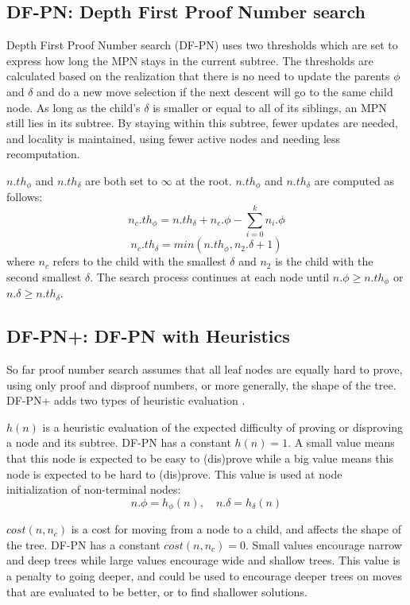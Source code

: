 \subsection{DF-PN: Depth First Proof Number search} \label{sec:DF-PN}

Depth First Proof Number search (DF-PN)\cite{nagai1999-DFPN} uses two thresholds which are set to express how long the MPN stays in the current subtree. The thresholds are calculated based on the realization that there is no need to update the parents $\phi$ and $\delta$ and do a new move selection if the next descent will go to the same child node. As long as the child's $\delta$ is smaller or equal to all of its siblings, an MPN still lies in its subtree. By staying within this subtree, fewer updates are needed, and locality is maintained, using fewer active nodes and needing less recomputation.

$n.th_\phi$ and $n.th_\delta$ are both set to $\infty$ at the root. $n.th_\phi$ and $n.th_\delta$ are computed as follows: $$n_c.th_\phi = n.th_\delta + n_c.\phi - \displaystyle\sum\limits_{i=0}^k n_i. \phi$$ $$n_c.th_\delta = min(n.th_\phi, n_2.\delta + 1)$$ where $n_c$ refers to the child with the smallest $\delta$ and $n_2$ is the child with the second smallest $\delta$. The search process continues at each node until $n.\phi \geq n.th_\phi$ or $n.\delta \geq n.th_\delta$.


\subsection{DF-PN+: DF-PN with Heuristics} \label{sec:DF-PN+}

So far proof number search assumes that all leaf nodes are equally hard to prove, using only proof and disproof numbers, or more generally, the shape of the tree. DF-PN+ adds two types of heuristic evaluation \cite{nagai-thesis}. 

$h(n)$ is a heuristic evaluation of the expected difficulty of proving or disproving a node and its subtree. DF-PN has a constant $h(n) = 1$. A small value means that this node is expected to be easy to (dis)prove while a big value means this node is expected to be hard to (dis)prove. This value is used at node initialization of non-terminal nodes: $$n.\phi = h_\phi(n), \quad n.\delta = h_\delta(n)$$

$cost(n, n_c)$ is a cost for moving from a node to a child, and affects the shape of the tree. DF-PN has a constant $cost(n, n_c) = 0$. Small values encourage narrow and deep trees while large values encourage wide and shallow trees. This value is a penalty to going deeper, and could be used to encourage deeper trees on moves that are evaluated to be better, or to find shallower solutions.

